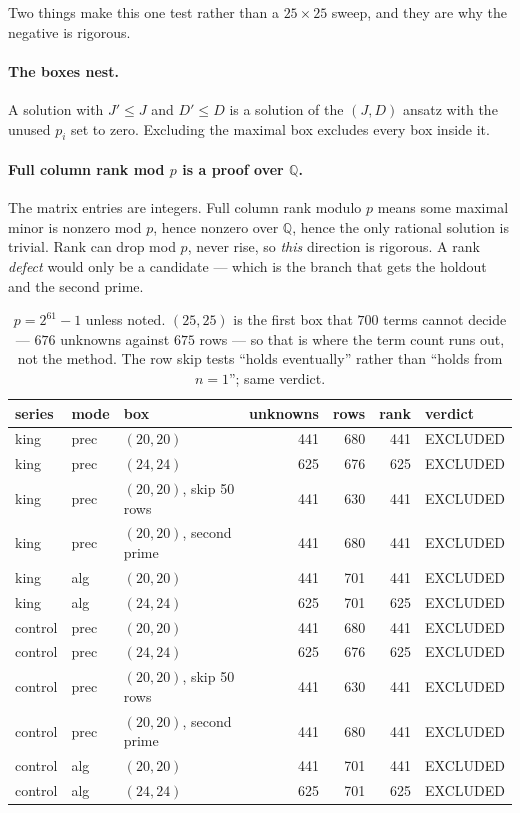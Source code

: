 \documentclass[11pt]{article}
\newcommand{\Q}{\mathbb{Q}}
\begin{document}
Two things make this one test rather than a $25\times25$ sweep, and they are why the negative is rigorous.

\paragraph{The boxes nest.} A solution with $J' \le J$ and $D' \le D$ is a
solution of the $(J,D)$ ansatz with the unused $p_i$ set to zero. Excluding the
maximal box excludes every box inside it.

\paragraph{Full column rank mod $p$ is a proof over $\Q$.} The matrix entries
are integers. Full column rank modulo $p$ means some maximal minor is nonzero
mod $p$, hence nonzero over $\Q$, hence the only rational solution is trivial.
Rank can drop mod $p$, never rise, so \emph{this} direction is rigorous. A rank
\emph{defect} would only be a candidate --- which is the branch that gets the
holdout and the second prime.

\begin{table}[H]
\centering\small
\begin{tabular}{l l l r r r l}
\toprule
series & mode & box & unknowns & rows & rank & verdict \\
\midrule
king    & prec & $(20,20)$ & 441 & 680 & 441 & EXCLUDED \\
king    & prec & $(24,24)$ & 625 & 676 & 625 & EXCLUDED \\
king    & prec & $(20,20)$, skip 50 rows & 441 & 630 & 441 & EXCLUDED \\
king    & prec & $(20,20)$, second prime & 441 & 680 & 441 & EXCLUDED \\
king    & alg  & $(20,20)$ & 441 & 701 & 441 & EXCLUDED \\
king    & alg  & $(24,24)$ & 625 & 701 & 625 & EXCLUDED \\
control & prec & $(20,20)$ & 441 & 680 & 441 & EXCLUDED \\
control & prec & $(24,24)$ & 625 & 676 & 625 & EXCLUDED \\
control & prec & $(20,20)$, skip 50 rows & 441 & 630 & 441 & EXCLUDED \\
control & prec & $(20,20)$, second prime & 441 & 680 & 441 & EXCLUDED \\
control & alg  & $(20,20)$ & 441 & 701 & 441 & EXCLUDED \\
control & alg  & $(24,24)$ & 625 & 701 & 625 & EXCLUDED \\
\bottomrule
\end{tabular}
\caption{$p = 2^{61}-1$ unless noted. $(25,25)$ is the first box that $700$
terms cannot decide --- $676$ unknowns against $675$ rows --- so that is where
the term count runs out, not the method. The row skip tests ``holds eventually''
rather than ``holds from $n=1$''; same verdict.}
\label{tab:excl}
\end{table}
\end{document}
